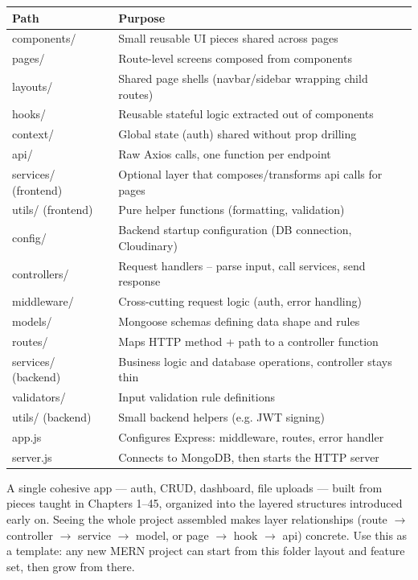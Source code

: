 \begin{tabularx}{\textwidth}{@{}>{\ttfamily}p{3.2cm}X@{}}
\toprule
Path & Purpose \\
\midrule
components/ & Small reusable UI pieces shared across pages \\
pages/ & Route-level screens composed from components \\
layouts/ & Shared page shells (navbar/sidebar wrapping child routes) \\
hooks/ & Reusable stateful logic extracted out of components \\
context/ & Global state (auth) shared without prop drilling \\
api/ & Raw Axios calls, one function per endpoint \\
services/ (frontend) & Optional layer that composes/transforms api calls
for pages \\
utils/ (frontend) & Pure helper functions (formatting, validation) \\
config/ & Backend startup configuration (DB connection, Cloudinary) \\
controllers/ & Request handlers -- parse input, call services, send
response \\
middleware/ & Cross-cutting request logic (auth, error handling) \\
models/ & Mongoose schemas defining data shape and rules \\
routes/ & Maps HTTP method + path to a controller function \\
services/ (backend) & Business logic and database operations, controller
stays thin \\
validators/ & Input validation rule definitions \\
utils/ (backend) & Small backend helpers (e.g. JWT signing) \\
app.js & Configures Express: middleware, routes, error handler \\
server.js & Connects to MongoDB, then starts the HTTP server \\
\bottomrule
\end{tabularx}

\whatwhyhow
{A single cohesive app --- auth, CRUD, dashboard, file uploads --- built from pieces taught in Chapters 1--45, organized into the layered structures introduced early on.}
{Seeing the whole project assembled makes layer relationships (route $\to$ controller $\to$ service $\to$ model, or page $\to$ hook $\to$ api) concrete.}
{Use this as a template: any new MERN project can start from this folder layout and feature set, then grow from there.}
